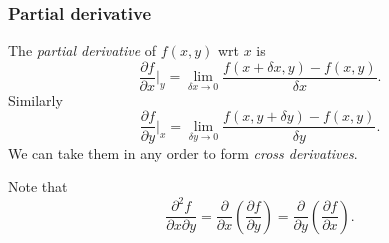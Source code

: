 \documentclass[a4paper]{article}
\begin{document}
        \subsubsection{Partial derivative}
        \begin{definition}
            The \textit{partial derivative} of $ f(x,y) $ wrt $x$ is 
            \begin{equation}
                \frac{\partial f}{\partial x}\Big|_y = \lim_{\delta x \to 0} \frac{f(x+\delta x,y)-f(x,y)}{\delta x}.
            \end{equation}
            Similarly 
            \[
                \frac{\partial f}{\partial y}\Big|_x = \lim_{\delta y \to 0} \frac{f(x,y+\delta y)-f(x,y)}{\delta y}.
            \]
            We can take them in any order to form \textit{cross derivatives}.
        \end{definition}
        Note that 
        \begin{equation}
            \frac{\partial^2 f}{\partial x \partial y} = \frac{\partial }{\partial x}\left( \frac{\partial f}{\partial y}  \right)=\frac{\partial }{\partial y}\left( \frac{\partial f}{\partial x}  \right) .
        \end{equation}
\end{document}
